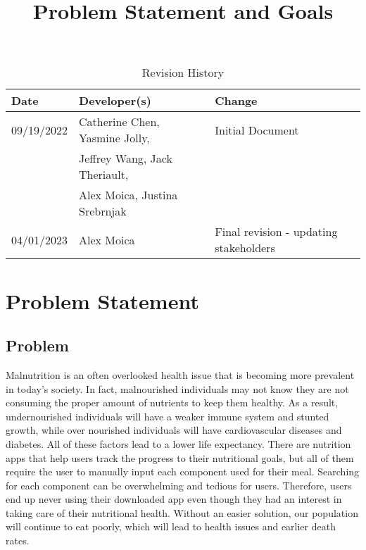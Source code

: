 \documentclass{article}
\title{Problem Statement and Goals\\\progname}
\author{\authname}
\date{}
\begin{document}
\maketitle

\begin{table}[hp]
\caption{Revision History} \label{TblRevisionHistory}
\begin{tabularx}{\textwidth}{llX}
\toprule
\textbf{Date} & \textbf{Developer(s)} & \textbf{Change}\\
\midrule
09/19/2022 & Catherine Chen, Yasmine Jolly, &Initial Document\\ 
&Jeffrey Wang, Jack Theriault, &\\
&Alex Moica, Justina Srebrnjak &\\
04/01/2023 & Alex Moica &Final revision - updating stakeholders\\ 
\bottomrule
\end{tabularx}
\end{table}

\newpage

\section{Problem Statement}


\subsection{Problem}

Malnutrition is an often overlooked health issue that is becoming more prevalent in today's society. In fact, malnourished individuals may not know they are not consuming the proper amount of nutrients to keep them healthy. As a result, undernourished individuals will have a weaker immune system and stunted growth, while over nourished individuals will have cardiovascular diseases and diabetes. All of these factors lead to a lower life expectancy. There are nutrition apps that help users track the progress to their nutritional goals, but all of them require the user to manually input each component used for their meal. Searching for each component can be overwhelming and tedious for users. Therefore, users end up never using their downloaded app even though they had an interest in taking care of their nutritional health. Without an easier solution, our population will continue to eat poorly, which will lead to health issues and earlier death rates.
\end{document}
